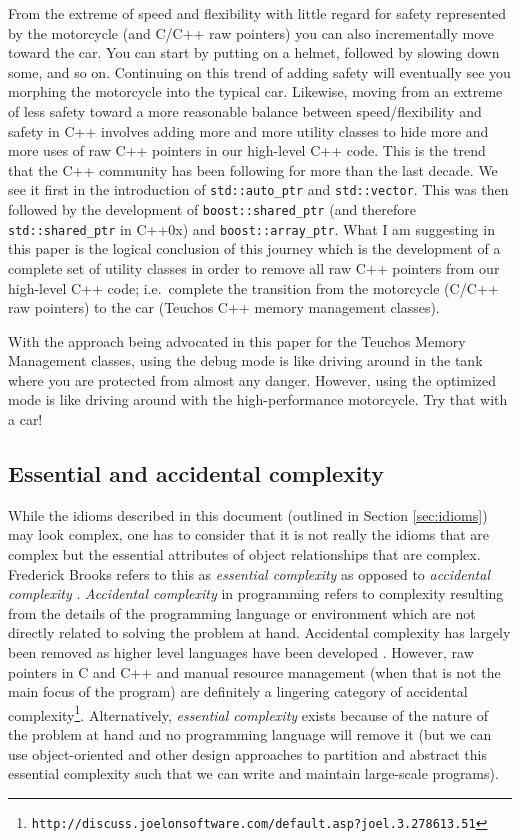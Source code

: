 \documentclass[pdf,ps2pdf,11pt]{SANDreport}
\begin{document}
From the extreme of speed and flexibility with little regard for
safety represented by the motorcycle (and C/C++ raw pointers) you can
also incrementally move toward the car.  You can start by putting on a
helmet, followed by slowing down some, and so on.  Continuing on this
trend of adding safety will eventually see you morphing the motorcycle
into the typical car.  Likewise, moving from an extreme of less safety
toward a more reasonable balance between speed/flexibility and safety
in C++ involves adding more and more utility classes to hide more and
more uses of raw C++ pointers in our high-level C++ code.  This is the
trend that the C++ community has been following for more than the last
decade.  We see it first in the introduction of
{}\texttt{std::auto\_ptr} and {}\texttt{std::vector}.  This was then
followed by the development of {}\texttt{boost::shared\_ptr} (and
therefore {}\texttt{std::shared\_ptr} in C++0x) and
{}\texttt{boost::array\_ptr}.  What I am suggesting in this paper is
the logical conclusion of this journey which is the development of a
complete set of utility classes in order to remove all raw C++
pointers from our high-level C++ code; i.e.\ complete the transition
from the motorcycle (C/C++ raw pointers) to the car (Teuchos C++
memory management classes).

With the approach being advocated in this paper for the Teuchos Memory
Management classes, using the debug mode is like driving around in the
tank where you are protected from almost any danger.  However, using
the optimized mode is like driving around with the high-performance
motorcycle.  Try that with a car!


%
{}\subsection{Essential and accidental complexity}
%

While the idioms described in this document (outlined in Section
{}\ref{sec:idioms}) may look complex, one has to consider that it is
not really the idioms that are complex but the essential attributes of
object relationships that are complex.  Frederick Brooks refers to
this as {}\textit{essential complexity} as opposed to
{}\textit{accidental complexity} {}\cite{MythicalManMonth95}.
{}\textit{Accidental complexity} in programming refers to complexity
resulting from the details of the programming language or environment
which are not directly related to solving the problem at hand.
Accidental complexity has largely been removed as higher level
languages have been developed {}\cite[Chapter 16]{MythicalManMonth95}.
However, raw pointers in C and C++ and manual resource management
(when that is not the main focus of the program) are definitely a
lingering category of accidental complexity\footnote{
{}\texttt{http://discuss.joelonsoftware.com/default.asp?joel.3.278613.51}}.
Alternatively, {}\textit{essential complexity} exists because of the
nature of the problem at hand and no programming language will remove
it (but we can use object-oriented and other design approaches to
partition and abstract this essential complexity such that we can
write and maintain large-scale programs).
\end{document}
